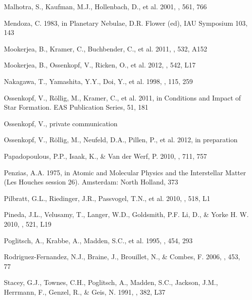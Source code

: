 \documentclass[12pt]{aastex}
\begin{document}
\begin{thebibliography}{}
Malhotra, S., Kaufman, M.J., Hollenbach, D., et al. 2001, \apj, 561, 766

Mendoza, C. 1983, in Planetary Nebulae, D.R. Flower (ed), IAU Symposium 103, 143

Mookerjea, B., Kramer, C., Buchbender, C., et al. 2011, \aap, 532, A152

Mookerjea, B., Ossenkopf, V., Ricken, O., et al. 2012, \aap, 542, L17

Nakagawa, T., Yamashita, Y.Y., Doi, Y., et al. 1998, \apjs, 115, 259

Ossenkopf, V., R\"{o}llig, M., Kramer, C., et al. 2011, in Conditions and Impact of Star Formation.  EAS Publication Series, 51, 181

Ossenkopf, V., private communication

Ossenkopf, V., R\"{o}llig, M., Neufeld, D.A., Pillen, P., et al. 2012, in preparation

Papadopoulous, P.P., Isaak, K., \& Van der Werf, P. 2010, \apj, 711, 757

Penzias, A.A. 1975, in Atomic and Molecular Physics and the Interstellar Matter (Les Houches session 26). Amsterdam:  North Holland, 373%

Pilbratt, G.L., Riedinger, J.R., Passvogel, T.N., et al. 2010, \aap, 518, L1

Pineda, J.L., Velusamy, T., Langer, W.D., Goldsmith, P.F. Li, D., \& Yorke H. W. 2010, \aap, 521, L19

Poglitsch, A., Krabbe, A., Madden, S.C., et al. 1995, \apj, 454, 293

Rodriguez-Fernandez, N.J., Braine, J., Brouillet, N., \& Combes, F. 2006, \aap, 453, 77

Stacey, G.J., Townes, C.H., Poglitsch, A., Madden, S.C., Jackson, J.M., Herrmann, F., Genzel, R., \& Geis, N. 1991, \apj, 382, L37


\end{thebibliography}
\end{document}
